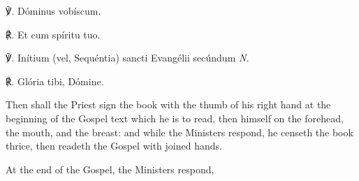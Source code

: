 ℣. Dóminus vobíscum.

℟. Et cum spíritu tuo.

℣. Inítium (vel, Sequéntia) {} sancti Evangélii secúndum \textit{N.}

℟. Glória tibi, Dómine.
\begin{rubric}
    Then shall the Priest sign the book with the thumb of his right hand at the beginning of the Gospel text which he is to read, then himself on the forehead, the mouth, and the breast: and while the Ministers respond, he censeth the book thrice, then readeth the Gospel with joined hands.
\end{rubric}
\begin{rubric}
    At the end of the Gospel, the Ministers respond,
\end{rubric}

